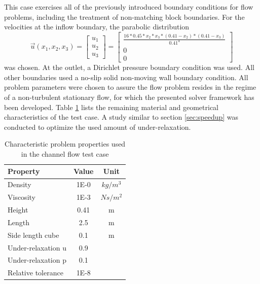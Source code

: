 This case exercises all of the previously introduced boundary conditions for flow problems, including the treatment of non-matching block boundaries. For the velocities at the inflow boundary, the parabolic distribution
\begin{displaymath}
  \vec{u}(x_1,x_2,x_3) 
  =
\left[
  \begin{array}{ccc}
    u_1 \\
    u_2 \\
    u_3 
  \end{array}
\right]
  =
\left[
  \begin{array}{ccc}
    \frac{ 16 * 0.45 * x_2 * x_3 * \left( 0.41 - x_2 \right) * \left( 0.41 - x_3 \right)}{0.41^4}
    \\[0.9em]
    0 \\[0.3em]
    0 
  \end{array}
\right]
\end{displaymath}
was chosen. At the outlet, a Dirichlet pressure boundary condition was used. All other boundaries used a no-slip solid non-moving wall boundary condition. All problem parameters were chosen to assure the flow problem resides in the regime of a non-turbulent stationary flow, for which the presented solver framework has been developed. Table \ref{tab:channel} lists the remaining material and geometrical characteristics of the test case. A study similar to section \ref{sec:speedup} was conducted to optimize the used amount of under-relaxation.

\begin{table}[h!]\centering
  \caption{Characteristic problem properties used in the channel flow test case}
  \begin{tabular}{lcc}\toprule
    Property & Value & Unit \\
    \midrule
    \rowcolor{black!20} Density            & 1E-0 & $kg/m^3$  \\
    \rowcolor{black!00} Viscosity          & 1E-3 & $Ns/m^2$  \\
    \rowcolor{black!20} Height             & 0.41 & m         \\
    \rowcolor{black!00} Length             & 2.5  & m         \\
    \rowcolor{black!20} Side length cube   & 0.1  & m   \\
    \rowcolor{black!00} Under-relaxation u & 0.9  &    \\
    \rowcolor{black!20} Under-relaxation p & 0.1  &    \\
    \rowcolor{black!00} Relative tolerance & 1E-8      &
  \end{tabular}
  \label{tab:channel}
\end{table}

